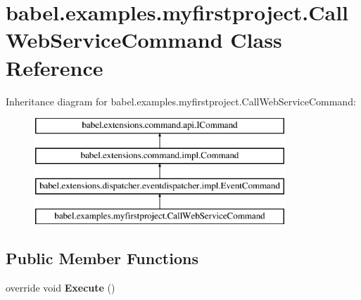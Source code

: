\hypertarget{classbabel_1_1examples_1_1myfirstproject_1_1_call_web_service_command}{\section{babel.\-examples.\-myfirstproject.\-Call\-Web\-Service\-Command Class Reference}
\label{classbabel_1_1examples_1_1myfirstproject_1_1_call_web_service_command}
}
Inheritance diagram for babel.\-examples.\-myfirstproject.\-Call\-Web\-Service\-Command\-:\begin{figure}[H]
\begin{center}
\leavevmode
\includegraphics[height=4.000000cm]{classbabel_1_1examples_1_1myfirstproject_1_1_call_web_service_command}
\end{center}
\end{figure}
\subsection*{Public Member Functions}
\begin{DoxyCompactItemize}
\item 
\hypertarget{classbabel_1_1examples_1_1myfirstproject_1_1_call_web_service_command_a26d1a70261d7c93243128056eaa456ae}{override void {\bfseries Execute} ()}\label{classbabel_1_1examples_1_1myfirstproject_1_1_call_web_service_command_a26d1a70261d7c93243128056eaa456ae}

\end{DoxyCompactItemize}
